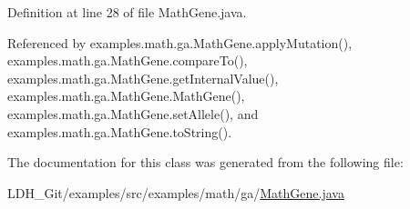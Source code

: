Definition at line 28 of file Math\-Gene.\-java.



Referenced by examples.\-math.\-ga.\-Math\-Gene.\-apply\-Mutation(), examples.\-math.\-ga.\-Math\-Gene.\-compare\-To(), examples.\-math.\-ga.\-Math\-Gene.\-get\-Internal\-Value(), examples.\-math.\-ga.\-Math\-Gene.\-Math\-Gene(), examples.\-math.\-ga.\-Math\-Gene.\-set\-Allele(), and examples.\-math.\-ga.\-Math\-Gene.\-to\-String().



The documentation for this class was generated from the following file\-:\begin{DoxyCompactItemize}
\item 
L\-D\-H\-\_\-\-Git/examples/src/examples/math/ga/\hyperlink{_math_gene_8java}{Math\-Gene.\-java}\end{DoxyCompactItemize}
